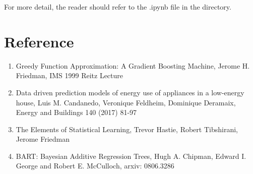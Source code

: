 \documentclass{article}
\begin{document}
For more detail, the reader should refer to the .ipynb file in the directory.
\section{Reference}
\begin{enumerate}
\item
Greedy Function Approximation: A Gradient Boosting Machine, Jerome H. Friedman, IMS 1999 Reitz Lecture
\item
Data driven prediction models of energy use of appliances in a low-energy house, Luis M. Candanedo, Veronique Feldheim, Dominique Deramaix, Energy and Buildings 140 (2017) 81-97
\item
The Elements of Statistical Learning, Trevor Hastie, Robert Tibshirani, Jerome Friedman
\item
BART: Bayesian Additive Regression Trees, Hugh A. Chipman, Edward I. George and Robert E. McCulloch, arxiv: 0806.3286
\end{enumerate}
\end{document}
